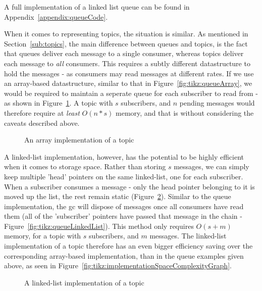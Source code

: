 A full implementation of a linked list queue can be found in
Appendix~\ref{appendix:queueCode}.

When it comes to representing topics, the situation is similar. As mentioned in
Section~\ref{sub:topics}, the main difference between queues and topics, is the
fact that queues deliver each message to a single consumer, whereas topics
deliver each message to \emph{all} consumers. This requires a subtly different
datastructure to hold the messages - as consumers may read messages at different
rates. If we use an array-based datastructure, similar to that in
Figure~\ref{fig:tikz:queueArray}, we would be required to maintain a seperate
queue for each subscriber to read from - as shown in
Figure~\ref{fig:tikz:arrayTopic}. A topic with $s$ subscribers, and $n$ pending
messages would therefore require at \emph{least} $O(n * s)$ memory, and that is
without considering the caveats described above. \\

\begin{figure}[H]
  \centering
  
  \caption{An array implementation of a topic}
  \label{fig:tikz:arrayTopic}
\end{figure}

A linked-list implementation, however, has the potential to be highly efficient
when it comes to storage space. Rather than storing $s$ messages, we can simply
keep multiple 'head' pointers on the same linked-list, one for each subscriber.
When a subscriber consumes a message - only the head pointer belonging to it is
moved up the list, the rest remain static
(Figure~\ref{fig:tikz:linkedListTopic}). Similar to the queue implementation,
the \gls{gc} will dispose of messages once all consumers have read them (all of
the 'subscriber' pointers have passed that message in the chain -
Figure~\ref{fig:tikz:queueLinkedList}). This method only requires $O(s + m)$
memory, for a topic with $s$ subscribers, and $m$ messages. The linked-list
implementation of a topic therefore has an even bigger efficiency saving over
the corresponding array-based implementation, than in the queue examples given
above, as seen in Figure~\ref{fig:tikz:implementationSpaceComplexityGraph}.

\begin{figure}[H]
  \centering
  
  \caption{A linked-list implementation of a topic}
  \label{fig:tikz:linkedListTopic}
\end{figure}

